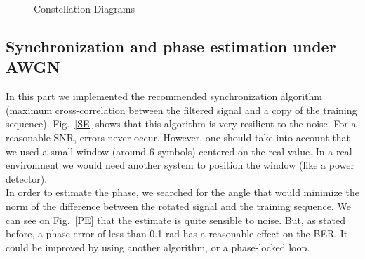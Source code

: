 \documentclass[a4paper,12pt]{article}
\begin{document}
\begin{figure}[ht]
\caption{Constellation Diagrams}
\label{Constellation}
\end{figure}


\subsection{Synchronization and phase estimation under AWGN}
In this part we implemented the recommended synchronization algorithm (maximum cross-correlation between the filtered signal and a copy of the training sequence). Fig.~\ref{SE} shows that this algorithm is very resilient to the noise. For a reasonable SNR, errors never occur. However, one should take into account that we used a small window (around 6 symbols) centered on the real value. In a real environment we would need another system to position the window (like a power detector). \\

In order to estimate the phase, we searched for the angle that would minimize the norm of the difference between the rotated signal and the training sequence. We can see on Fig.~\ref{PE} that the estimate is quite sensible to noise. But, as stated before, a phase error of less than 0.1 rad has a reasonable effect on the BER. It could be improved by using another algorithm, or a phase-locked loop.
\end{document}
